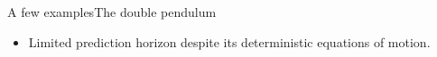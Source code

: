 \documentclass[usenames,dvipsnames,svgnames,10pt,aspectratio=169]{beamer}
\begin{document}
\begin{frame}[t, c]{A few examples}{The double pendulum}
\begin{minipage}{.48\textwidth}
\begin{itemize}
			\item Limited prediction horizon despite its deterministic equations of motion.
		\end{itemize}
	\end{minipage}%
	\hfill
	\begin{minipage}{.48\textwidth}
		\vspace{-1cm}
		\begin{center}
		\end{center}
	\end{minipage}

	\vspace{1cm}
\end{frame}
\end{document}
